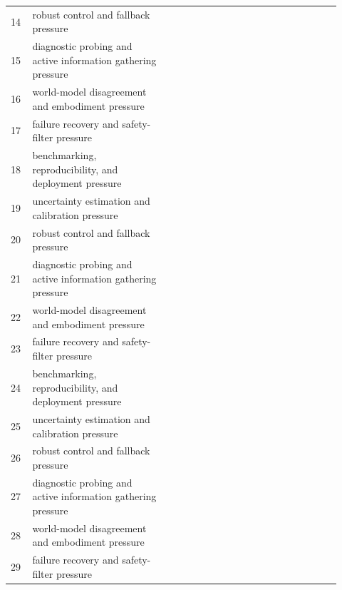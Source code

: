 \documentclass[11pt]{article}
\begin{document}
\begin{longtable}{p{0.06\linewidth}p{0.38\linewidth}p{0.48\linewidth}}
14 & robust control and fallback pressure & \citep{chalaki2020zeroshot40,chatila2005position41,lu2024realworld42} \\
15 & diagnostic probing and active information gathering pressure & \citep{ferraro2025focus43,falco2020benchmarking44,kimndontomotoos45} \\
16 & world-model disagreement and embodiment pressure & \citep{bhatt2023data46,huffaker2018capstone47,ho2021effects48} \\
17 & failure recovery and safety-filter pressure & \citep{collins2020utilising49,obert2023noiseimmune50,wang2024driving51} \\
18 & benchmarking, reproducibility, and deployment pressure & \citep{du2023overview52,wu2017remaining53,bocci2016youth54} \\
19 & uncertainty estimation and calibration pressure & \citep{dursun2025deep55,dhibi2026physicsinformed56,dodangeh2025effects57} \\
20 & robust control and fallback pressure & \citep{radosavovic2023realworld58,watts2002k59,greenbaumndmaking60} \\
21 & diagnostic probing and active information gathering pressure & \citep{lindselfsupervised61,lindselfsupervised62,brohan2023rt163} \\
22 & world-model disagreement and embodiment pressure & \citep{grant2022considerations64,alabbad2026an65,rashidibajgan2022improving66} \\
23 & failure recovery and safety-filter pressure & \citep{hurst2019walk67,huang2026nano68,zhang2025worldinworld69} \\
24 & benchmarking, reproducibility, and deployment pressure & \citep{liang2025reald2iff70,liu2026jailwam71,sun2026sants72} \\
25 & uncertainty estimation and calibration pressure & \citep{damm2025kinodynamic73,hill2025communicating74,he2025scaling75} \\
26 & robust control and fallback pressure & \citep{cui2020semantic76,safavinaini2026grounding77,qiu2026making78} \\
27 & diagnostic probing and active information gathering pressure & \citep{garrido2026learning79,wang2026world80,guo2026unified81} \\
28 & world-model disagreement and embodiment pressure & \citep{nam2026causaljepa82,xue2026acwmphys83,yi2023winning84} \\
29 & failure recovery and safety-filter pressure & \citep{sobik2023energy85,seitzer2022the86,sinha2022awrbas87} \\

\end{longtable}
\end{document}
